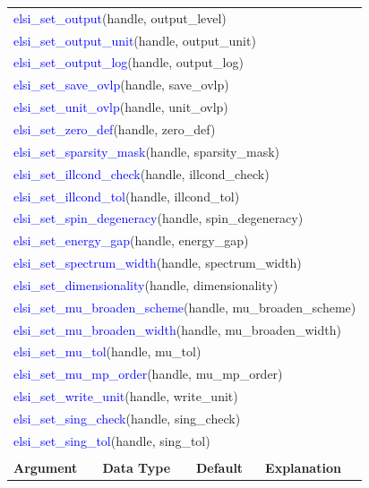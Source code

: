 \documentclass{report}
\newcommand{\tcb}[1]{\textcolor{blue}{#1}}
\begin{document}
\begin{longtable}[]{|p{30mm}|p{20mm}|p{15mm}|p{100mm}|}
\multicolumn{4}{l}{\tcb{elsi\_set\_output}(handle, output\_level)}\\
\multicolumn{4}{l}{\tcb{elsi\_set\_output\_unit}(handle, output\_unit)}\\
\multicolumn{4}{l}{\tcb{elsi\_set\_output\_log}(handle, output\_log)}\\
\multicolumn{4}{l}{\tcb{elsi\_set\_save\_ovlp}(handle, save\_ovlp)}\\
\multicolumn{4}{l}{\tcb{elsi\_set\_unit\_ovlp}(handle, unit\_ovlp)}\\
\multicolumn{4}{l}{\tcb{elsi\_set\_zero\_def}(handle, zero\_def)}\\
\multicolumn{4}{l}{\tcb{elsi\_set\_sparsity\_mask}(handle, sparsity\_mask)}\\
\multicolumn{4}{l}{\tcb{elsi\_set\_illcond\_check}(handle, illcond\_check)}\\
\multicolumn{4}{l}{\tcb{elsi\_set\_illcond\_tol}(handle, illcond\_tol)}\\
\multicolumn{4}{l}{\tcb{elsi\_set\_spin\_degeneracy}(handle, spin\_degeneracy)}\\
\multicolumn{4}{l}{\tcb{elsi\_set\_energy\_gap}(handle, energy\_gap)}\\
\multicolumn{4}{l}{\tcb{elsi\_set\_spectrum\_width}(handle, spectrum\_width)}\\
\multicolumn{4}{l}{\tcb{elsi\_set\_dimensionality}(handle, dimensionality)}\\
\multicolumn{4}{l}{\tcb{elsi\_set\_mu\_broaden\_scheme}(handle, mu\_broaden\_scheme)}\\
\multicolumn{4}{l}{\tcb{elsi\_set\_mu\_broaden\_width}(handle, mu\_broaden\_width)}\\
\multicolumn{4}{l}{\tcb{elsi\_set\_mu\_tol}(handle, mu\_tol)}\\
\multicolumn{4}{l}{\tcb{elsi\_set\_mu\_mp\_order}(handle, mu\_mp\_order)}\\
\multicolumn{4}{l}{\tcb{elsi\_set\_write\_unit}(handle, write\_unit)}\\
\multicolumn{4}{l}{\tcb{elsi\_set\_sing\_check}(handle, sing\_check)}\\
\multicolumn{4}{l}{\tcb{elsi\_set\_sing\_tol}(handle, sing\_tol)}\\
\multicolumn{4}{l}{}\\
\hline
\multicolumn{1}{|l|}{\textbf{Argument}} & \multicolumn{1}{l|}{\textbf{Data Type}} & \multicolumn{1}{l|}{\textbf{Default}} & \multicolumn{1}{l|}{\textbf{Explanation}}\\

\end{longtable}
\end{document}
